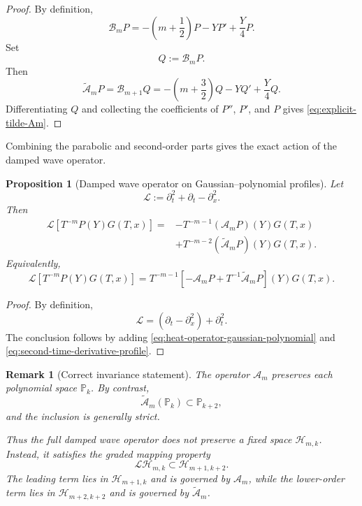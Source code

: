 \documentclass[11pt]{amsart}
\newtheorem{proposition}{Proposition}[section]
\newtheorem{remark}{Remark}[section]
\theoremstyle{definition}
\theoremstyle{remark}
\numberwithin{equation}{section}
\begin{document}
\begin{proof}
By definition,
\[
\mathcal B_mP
=
-\left(m+\frac12\right)P
-YP'
+\frac Y4P.
\]
Set
\[
Q:=\mathcal B_mP.
\]
Then
\[
\widetilde{\mathcal A}_mP
=
\mathcal B_{m+1}Q
=
-\left(m+\frac32\right)Q
-YQ'
+\frac Y4Q.
\]
Differentiating $Q$ and collecting the coefficients of
$P''$, $P'$, and $P$ gives
\eqref{eq:explicit-tilde-Am}.
\end{proof}

Combining the parabolic and second-order parts gives the exact action
of the damped wave operator.

\begin{proposition}[Damped wave operator on Gaussian--polynomial profiles]
\label{prop:damped-wave-gaussian-polynomial}
Let
\[
\mathcal L
:=
\partial_t^2+\partial_t-\partial_x^2.
\]
Then
\begin{align}
\mathcal L
\left[
T^{-m}P(Y)G(T,x)
\right]
={}&
-T^{-m-1}
(\mathcal A_mP)(Y)G(T,x)
\nonumber\\
&+
T^{-m-2}
(\widetilde{\mathcal A}_mP)(Y)G(T,x).
\label{eq:damped-wave-polynomial-action}
\end{align}
Equivalently,
\begin{equation}\label{eq:damped-wave-polynomial-action-factored}
\mathcal L
\left[
T^{-m}P(Y)G(T,x)
\right]
=
T^{-m-1}
\left[
-\mathcal A_mP
+
T^{-1}\widetilde{\mathcal A}_mP
\right](Y)
G(T,x).
\end{equation}
\end{proposition}

\begin{proof}
By definition,
\[
\mathcal L
=
(\partial_t-\partial_x^2)+\partial_t^2.
\]
The conclusion follows by adding
\eqref{eq:heat-operator-gaussian-polynomial} and
\eqref{eq:second-time-derivative-profile}.
\end{proof}

\begin{remark}[Correct invariance statement]
\label{rem:correct-gaussian-polynomial-invariance}
The operator $\mathcal A_m$ preserves each polynomial space
$\mathbb P_k$. By contrast,
\[
\widetilde{\mathcal A}_m(\mathbb P_k)
\subset\mathbb P_{k+2},
\]
and the inclusion is generally strict.

Thus the full damped wave operator does not preserve a fixed space
$\mathcal H_{m,k}$. Instead, it satisfies the graded mapping property
\[
\mathcal L\mathcal H_{m,k}
\subset
\mathcal H_{m+1,k+2}.
\]
The leading term lies in $\mathcal H_{m+1,k}$ and is governed by
$\mathcal A_m$, while the lower-order term lies in
$\mathcal H_{m+2,k+2}$ and is governed by
$\widetilde{\mathcal A}_m$.
\end{remark}
\end{document}
